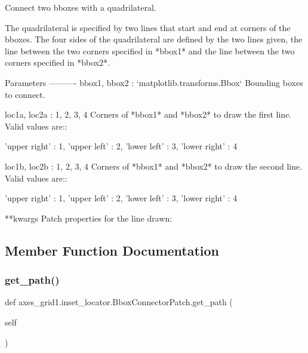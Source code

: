 \begin{DoxyVerb}Connect two bboxes with a quadrilateral.

The quadrilateral is specified by two lines that start and end at
corners of the bboxes. The four sides of the quadrilateral are defined
by the two lines given, the line between the two corners specified in
*bbox1* and the line between the two corners specified in *bbox2*.

Parameters
----------
bbox1, bbox2 : `matplotlib.transforms.Bbox`
    Bounding boxes to connect.

loc1a, loc2a : {1, 2, 3, 4}
    Corners of *bbox1* and *bbox2* to draw the first line.
    Valid values are::

'upper right'  : 1,
'upper left'   : 2,
'lower left'   : 3,
'lower right'  : 4

loc1b, loc2b : {1, 2, 3, 4}
    Corners of *bbox1* and *bbox2* to draw the second line.
    Valid values are::

'upper right'  : 1,
'upper left'   : 2,
'lower left'   : 3,
'lower right'  : 4

**kwargs
    Patch properties for the line drawn:

\end{DoxyVerb}
 

\subsection{Member Function Documentation}
\mbox{\label{classaxes__grid1_1_1inset__locator_1_1BboxConnectorPatch_aae1ec15e58fe97285b3d3809c3f72185}} 
\subsubsection{\texorpdfstring{get\+\_\+path()}{get\_path()}}
{\footnotesize\ttfamily def axes\+\_\+grid1.\+inset\+\_\+locator.\+Bbox\+Connector\+Patch.\+get\+\_\+path (\begin{DoxyParamCaption}\item[{}]{self }\end{DoxyParamCaption})}



